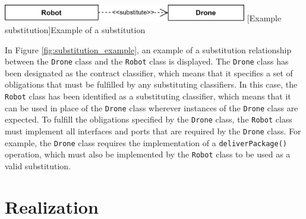 \documentclass[
	12pt,
    a4paper,
    egregdoesnotlikesansseriftitles, %
    toc=chapterentrywithdots,
    oneside, openany,
    titlepage,
    parskip=half,
    headings=normal,  %
    listof=totoc,
    bibliography=totocnumbered,
    index=totoc,
    captions=tableheading,  %
    listof=flat,
    numbers=noenddot, %
    final]
    {scrbook}
\begin{document}
\vspace{1em}
\begin{minipage}{\linewidth}
	\centering
	\includegraphics[width=0.8\textwidth]{figures/dependencies/substitute.jpg}
	[Example substitution]{Example of a substitution}
	\label{fig:substitution_example}
\end{minipage}

In Figure \ref{fig:substitution_example}, an example of a substitution relationship between the \texttt{Drone} class and the \texttt{Robot} class is displayed.
The \texttt{Drone} class has been designated as the contract classifier, which means that it specifies a set of obligations that must be fulfilled by any substituting classifiers. 
In this case, the \texttt{Robot} class has been identified as a substituting classifier, which means that it can be used in place of the \texttt{Drone} class wherever instances of the \texttt{Drone} class are expected.
To fulfill the obligations specified by the \texttt{Drone} class, the \texttt{Robot} class must implement all interfaces and ports that are required by the \texttt{Drone} class. 
For example, the \texttt{Drone} class requires the implementation of a \texttt{deliverPackage()} operation, which must also be implemented by the \texttt{Robot} class to be used as a valid substitution.


\section{Realization}
%
\end{document}
